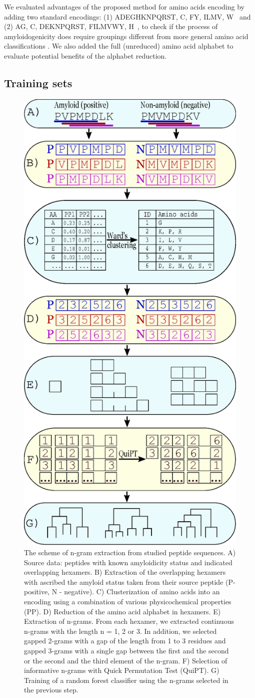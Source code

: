 \documentclass[fleqn,10pt,twoside]{gcb15submission}
\begin{document}
  We evaluated advantages of the proposed method for amino acids encoding by 
adding two standard encodings: (1) ADEGHKNPQRST, C, FY, ILMV, W~\citep{kosiol_new_2004} 
and (2) AG, C, DEKNPQRST, FILMVWY, H~\citep{melo_accuracy_2006}, to check if the process 
of amyloidogenicity does require groupings different from more general 
amino acid classifications . We also added the full (unreduced) amino acid alphabet to 
evaluate potential benefits of the alphabet reduction.

\subsection{Training sets}

\begin{figure}[bth]
\centerline{\includegraphics[width=0.3\linewidth]{figures/ngram_scheme.eps}} 
\caption{The scheme of n-gram extraction from studied peptide sequences. 
A) Source data: peptides with known amyloidicity status and indicated 
overlapping hexamers. 
B) Extraction of the overlapping hexamers with ascribed the 
amyloid status taken from their source peptide (P-positive, N - 
negative). 
C) Clusterization of amino acids into an encoding using a combination of various 
physicochemical properties (PP). 
D) Reduction of the amino acid alphabet in hexamers. 
E) Extraction of n-grams. From each hexamer, we extracted continuous n-grams 
with the length n = 1, 2 or 3. In addition, we selected gapped 2-grams with a 
gap of the length from 1 to 3 residues and gapped 3-grams with a single gap 
between the first and the second or the second and the third element of the 
n-gram.
F) Selection of informative n-grams with Quick Permutation Test (QuiPT).
G) Training of a random forest classifier using the n-grams selected in the previous 
step.}\label{fig:ngram_scheme} 
\end{figure}
\end{document}
